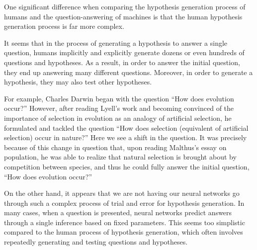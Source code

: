 One significant difference when comparing the hypothesis generation process of humans and the question-answering of machines is that the human hypothesis generation process is far more complex.


It seems that in the process of generating a hypothesis to answer a single question, humans implicitly and explicitly generate dozens or even hundreds of questions and hypotheses. As a result, in order to answer the initial question, they end up answering many different questions. Moreover, in order to generate a hypothesis, they may also test other hypotheses.


For example, Charles Darwin began with the question ``How does evolution occur?'' However, after reading Lyell's work and becoming convinced of the importance of selection in evolution as an analogy of artificial selection, he formulated and tackled the question ``How does selection (equivalent of artificial selection) occur in nature?'' Here we see a shift in the question. It was precisely because of this change in question that, upon reading Malthus's essay on population, he was able to realize that natural selection is brought about by competition between species, and thus he could fully answer the initial question, ``How does evolution occur?'' \cite{gribbin2022origin}

On the other hand, it appears that we are not having our neural networks go through such a complex process of trial and error for hypothesis generation. In many cases, when a question is presented, neural networks predict answers through a single inference based on fixed parameters. This seems too simplistic compared to the human process of hypothesis generation, which often involves repeatedly generating and testing questions and hypotheses.


